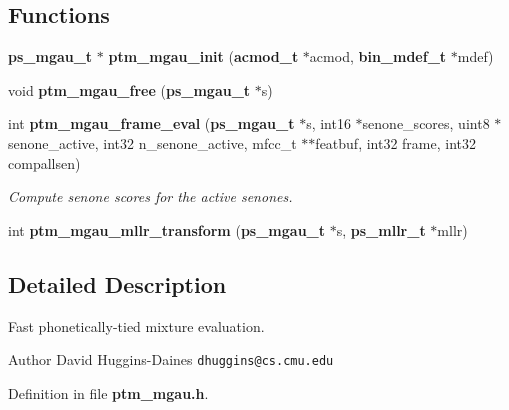 \subsection*{Functions}
\begin{DoxyCompactItemize}
\item 
{\bf ps\-\_\-mgau\-\_\-t} $\ast$ {\bfseries ptm\-\_\-mgau\-\_\-init} ({\bf acmod\-\_\-t} $\ast$acmod, {\bf bin\-\_\-mdef\-\_\-t} $\ast$mdef)\label{ptm__mgau_8h_a712679ca84e5b9f7351d969abbe1021a}

\item 
void {\bfseries ptm\-\_\-mgau\-\_\-free} ({\bf ps\-\_\-mgau\-\_\-t} $\ast$s)\label{ptm__mgau_8h_ac202aeb266594ab9c98294a73e16f00a}

\item 
int {\bf ptm\-\_\-mgau\-\_\-frame\-\_\-eval} ({\bf ps\-\_\-mgau\-\_\-t} $\ast$s, int16 $\ast$senone\-\_\-scores, uint8 $\ast$senone\-\_\-active, int32 n\-\_\-senone\-\_\-active, mfcc\-\_\-t $\ast$$\ast$featbuf, int32 frame, int32 compallsen)\label{ptm__mgau_8h_ae9fb76ef388e6541bd6c1b20fe8bc094}

\begin{DoxyCompactList}\small\item\em Compute senone scores for the active senones. \end{DoxyCompactList}\item 
int {\bfseries ptm\-\_\-mgau\-\_\-mllr\-\_\-transform} ({\bf ps\-\_\-mgau\-\_\-t} $\ast$s, {\bf ps\-\_\-mllr\-\_\-t} $\ast$mllr)\label{ptm__mgau_8h_ad619b68c9db5e2fed688f62ea4468c4e}

\end{DoxyCompactItemize}


\subsection{Detailed Description}
Fast phonetically-\/tied mixture evaluation. \begin{DoxyAuthor}{Author}
David Huggins-\/\-Daines {\tt dhuggins@cs.\-cmu.\-edu} 
\end{DoxyAuthor}


Definition in file {\bf ptm\-\_\-mgau.\-h}.

